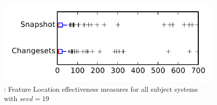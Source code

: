
\begin{figure}
\centering
\includegraphics[height=0.4\textheight]{figures/flt_seed/rq1_tiny_19}
\caption{\rone: Feature Location effectiveness measures for all subject systems with $seed=19$}
\label{fig:flt_seed:rq1:tiny}
\end{figure}
